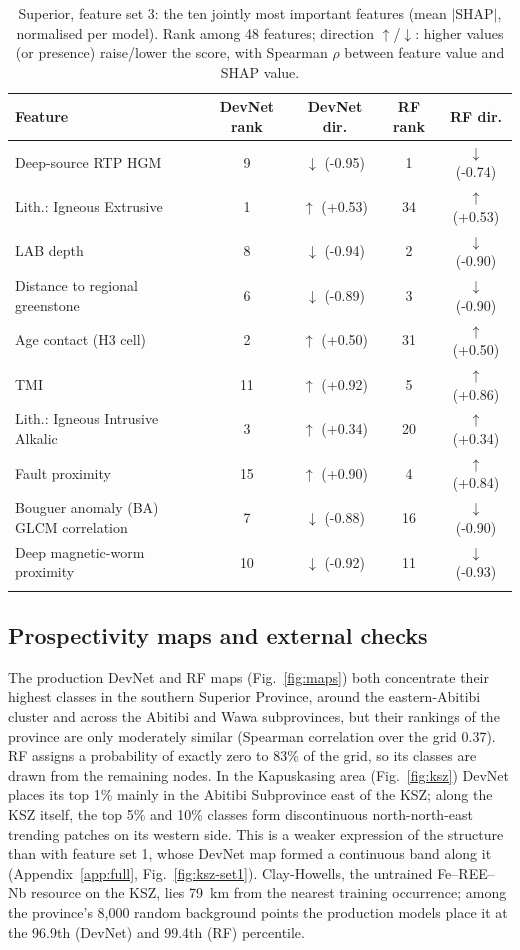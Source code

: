 \documentclass[pdflatex,sn-apa]{sn-jnl}
\begin{document}
\begin{table}[t]
\caption{Superior, feature set 3: the ten jointly most important features (mean $|$SHAP$|$, normalised per model). Rank among 48 features; direction $\uparrow$/$\downarrow$: higher values (or presence) raise/lower the score, with Spearman $\rho$ between feature value and SHAP value.}\label{tab:shap}
\scriptsize
\setlength{\tabcolsep}{2.5pt}
\begin{tabular*}{\textwidth}{@{\extracolsep\fill}lcccc}
\toprule
Feature & DevNet rank & DevNet dir. & RF rank & RF dir. \\
\midrule
Deep-source RTP HGM & 9 & $\downarrow$ (-0.95) & 1 & $\downarrow$ (-0.74) \\
Lith.: Igneous Extrusive & 1 & $\uparrow$ (+0.53) & 34 & $\uparrow$ (+0.53) \\
LAB depth & 8 & $\downarrow$ (-0.94) & 2 & $\downarrow$ (-0.90) \\
Distance to regional greenstone & 6 & $\downarrow$ (-0.89) & 3 & $\downarrow$ (-0.90) \\
Age contact (H3 cell) & 2 & $\uparrow$ (+0.50) & 31 & $\uparrow$ (+0.50) \\
TMI & 11 & $\uparrow$ (+0.92) & 5 & $\uparrow$ (+0.86) \\
Lith.: Igneous Intrusive Alkalic & 3 & $\uparrow$ (+0.34) & 20 & $\uparrow$ (+0.34) \\
Fault proximity & 15 & $\uparrow$ (+0.90) & 4 & $\uparrow$ (+0.84) \\
Bouguer anomaly (BA) GLCM correlation & 7 & $\downarrow$ (-0.88) & 16 & $\downarrow$ (-0.90) \\
Deep magnetic-worm proximity & 10 & $\downarrow$ (-0.92) & 11 & $\downarrow$ (-0.93) \\
\botrule
\end{tabular*}
\end{table}

\subsection{Prospectivity maps and external checks}\label{sec:res-maps}

The production DevNet and RF maps (Fig.~\ref{fig:maps}) both concentrate their highest classes in the southern Superior Province, around the eastern-Abitibi cluster and across the Abitibi and Wawa subprovinces, but their rankings of the province are only moderately similar (Spearman correlation over the grid 0.37). RF assigns a probability of exactly zero to 83\% of the grid, so its classes are drawn from the remaining nodes. In the Kapuskasing area (Fig.~\ref{fig:ksz}) DevNet places its top 1\% mainly in the Abitibi Subprovince east of the KSZ; along the KSZ itself, the top 5\% and 10\% classes form discontinuous north-north-east trending patches on its western side. This is a weaker expression of the structure than with feature set 1, whose DevNet map formed a continuous band along it (Appendix~\ref{app:full}, Fig.~\ref{fig:ksz-set1}). Clay-Howells, the untrained Fe--REE--Nb resource on the KSZ, lies 79~km from the nearest training occurrence; among the province's 8,000 random background points the production models place it at the 96.9th (DevNet) and 99.4th (RF) percentile.
\end{document}
